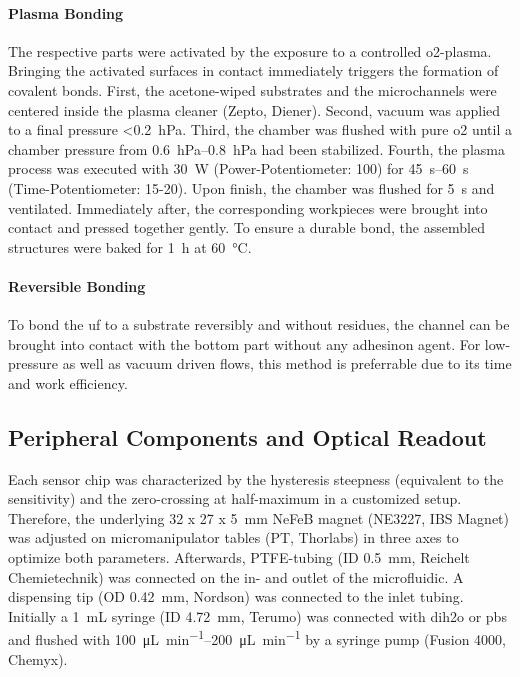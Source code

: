 \paragraph{Plasma Bonding}
\label{sec:meth:bond:plasma}
The respective parts were activated by the exposure to a controlled \gls{o2}-plasma. Bringing the activated surfaces in contact immediately triggers the formation of covalent bonds. First, the acetone-wiped substrates and the microchannels were centered inside the plasma cleaner (Zepto, Diener). Second, vacuum was applied to a final pressure <\SI{0.2}{\hecto\pascal}. Third, the chamber was flushed with pure \gls{o2} until a chamber pressure from \SIrange{0.6}{0.8}{\hecto\pascal} had been stabilized. Fourth, the plasma process was executed with \SI{30}{\watt} (Power-Potentiometer: 100) for \SIrange{45}{60}{\second} (Time-Potentiometer: 15-20). Upon finish, the chamber was flushed for \SI{5}{\second} and ventilated. Immediately after, the corresponding workpieces were brought into contact and pressed together gently. To ensure a durable bond, the assembled structures were baked for \SI{1}{\hour} at \SI{60}{\degreeCelsius}.



\paragraph{Reversible Bonding}
To bond the \gls{uf} to a substrate reversibly and without residues, the channel can be brought into contact with the bottom part without any adhesinon agent. For low-pressure as well as vacuum driven flows, this method is preferrable due to its time and work efficiency.

\subsection{Peripheral Components and Optical Readout}
Each sensor chip was characterized by the hysteresis steepness (equivalent to the sensitivity) and the zero-crossing at half-maximum in a customized setup. Therefore, the underlying 32 x 27 x \SI{5}{\milli\meter} NeFeB magnet (NE3227, IBS Magnet) was adjusted on micromanipulator tables (PT, Thorlabs) in three axes to optimize both parameters. Afterwards, PTFE-tubing (ID \SI{0.5}{\milli\meter}, Reichelt Chemietechnik) was connected on the in- and outlet of the microfluidic. A dispensing tip (OD \SI{0.42}{\milli\meter}, Nordson) was connected to the inlet tubing. Initially a \SI{1}{\milli\liter} syringe (ID \SI{4.72}{\milli\meter}, Terumo) was connected with \gls{dih2o} or \gls{pbs} and flushed with \SIrange{100}{200}{\micro\liter\per\minute} by a syringe pump (Fusion 4000, Chemyx).
